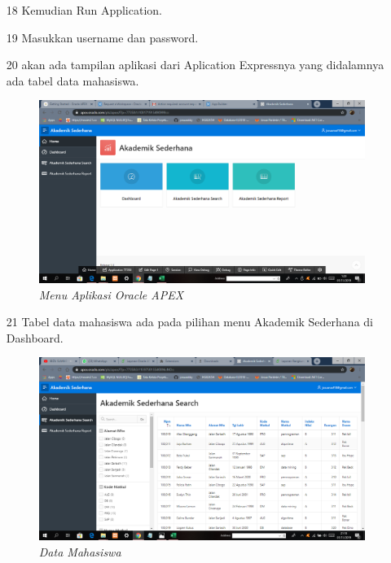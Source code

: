 \begin{enumerate}
\item[18] Kemudian Run Application.

 




\item[19]Masukkan username dan password.



\item[20]akan ada tampilan aplikasi dari Aplication Expressnya yang didalamnya ada tabel data mahasiswa.
 \begin{figure}[!htbp]
    \begin{center}
    \includegraphics[scale=0.2]{figures/dashboard.png}
    \caption{\textit{Menu Aplikasi Oracle APEX}}
    \end{center}   
    \end{figure}

 



\item[21]Tabel data mahasiswa ada pada pilihan menu Akademik Sederhana di Dashboard.
 \begin{figure}[!htbp]
    \begin{center}
    \includegraphics[scale=0.2]{figures/datafile.png}
    \caption{\textit{Data Mahasiswa}}
    \end{center}   
    \end{figure}
    

\end{enumerate}
